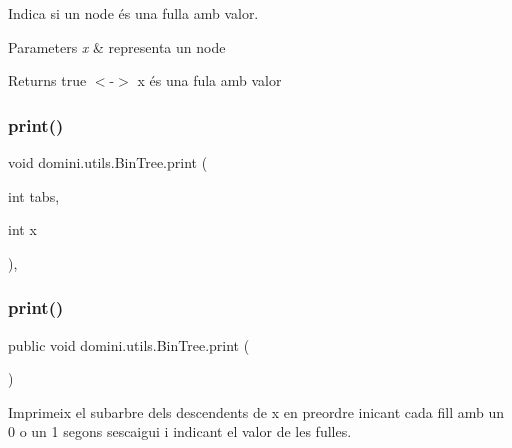 Indica si un node és una fulla amb valor. 


\begin{DoxyParams}{Parameters}
{\em x} & representa un node \\
\hline
\end{DoxyParams}
\begin{DoxyReturn}{Returns}
true $<$-\/$>$ x és una fula amb valor 
\end{DoxyReturn}
\mbox{\label{classdomini_1_1utils_1_1BinTree_a47c913594a3116b2e602c87fa4afc5c3}} 
\subsubsection{\texorpdfstring{print()}{print()}\hspace{0.1cm}{\footnotesize\ttfamily [1/2]}}
{\footnotesize\ttfamily void domini.\+utils.\+Bin\+Tree.\+print (\begin{DoxyParamCaption}\item[{int}]{tabs,  }\item[{int}]{x }\end{DoxyParamCaption})\hspace{0.3cm}{\ttfamily [inline]}, {\ttfamily [private]}}

\mbox{\label{classdomini_1_1utils_1_1BinTree_a0dc4daeb2d0e221cc8fc702d1d0ec795}} 
\subsubsection{\texorpdfstring{print()}{print()}\hspace{0.1cm}{\footnotesize\ttfamily [2/2]}}
{\footnotesize\ttfamily public void domini.\+utils.\+Bin\+Tree.\+print (\begin{DoxyParamCaption}{ }\end{DoxyParamCaption})\hspace{0.3cm}{\ttfamily [inline]}}



Imprimeix el subarbre dels descendents de x en preordre inicant cada fill amb un 0 o un 1 segons s\textquotesingle{}escaigui i indicant el valor de les fulles. 

